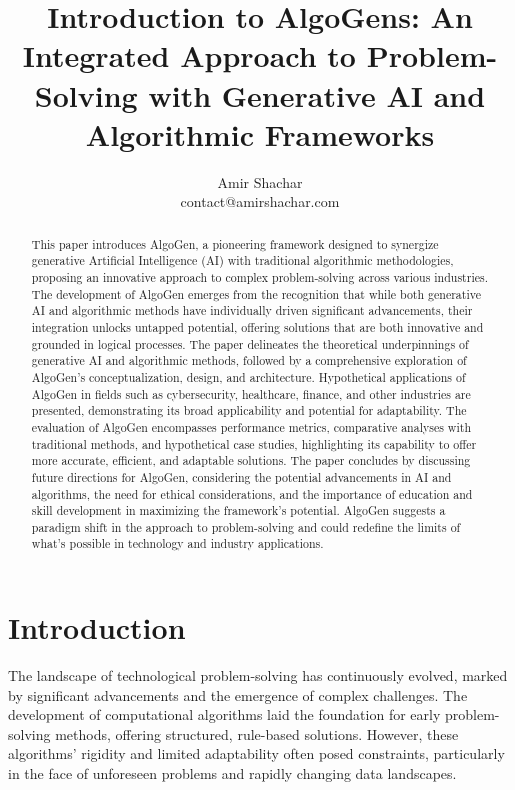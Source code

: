 \documentclass{article}
\title{Introduction to AlgoGens: An Integrated Approach to Problem-Solving with Generative AI and Algorithmic Frameworks}
\author{Amir Shachar\\
        contact@amirshachar.com}
\begin{document}
\maketitle

\begin{abstract}
This paper introduces AlgoGen, a pioneering framework designed to synergize generative Artificial Intelligence (AI) with traditional algorithmic methodologies, proposing an innovative approach to complex problem-solving across various industries. The development of AlgoGen emerges from the recognition that while both generative AI and algorithmic methods have individually driven significant advancements, their integration unlocks untapped potential, offering solutions that are both innovative and grounded in logical processes. The paper delineates the theoretical underpinnings of generative AI and algorithmic methods, followed by a comprehensive exploration of AlgoGen's conceptualization, design, and architecture. Hypothetical applications of AlgoGen in fields such as cybersecurity, healthcare, finance, and other industries are presented, demonstrating its broad applicability and potential for adaptability. The evaluation of AlgoGen encompasses performance metrics, comparative analyses with traditional methods, and hypothetical case studies, highlighting its capability to offer more accurate, efficient, and adaptable solutions. The paper concludes by discussing future directions for AlgoGen, considering the potential advancements in AI and algorithms, the need for ethical considerations, and the importance of education and skill development in maximizing the framework's potential. AlgoGen suggests a paradigm shift in the approach to problem-solving and could redefine the limits of what's possible in technology and industry applications.
\end{abstract}

\section{Introduction}

The landscape of technological problem-solving has continuously evolved, marked by significant advancements and the emergence of complex challenges. The development of computational algorithms laid the foundation for early problem-solving methods, offering structured, rule-based solutions. However, these algorithms' rigidity and limited adaptability often posed constraints, particularly in the face of unforeseen problems and rapidly changing data landscapes.
\end{document}

